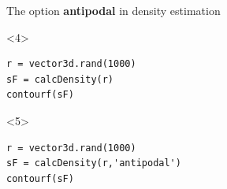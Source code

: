 \documentclass[compress]{beamer}
\begin{document}
\begin{frame}[fragile]
\begin{columns}
\begin{column}{8.5cm}
\begin{overlayarea}{8.5cm}{8cm}
\medskip
\pause

The option \textbf{antipodal} in density estimation
\begin{onlyenv}<4>
\begin{lstlisting}[style=input]
r = vector3d.rand(1000)
sF = calcDensity(r)
contourf(sF)
\end{lstlisting}
\end{onlyenv}
\begin{onlyenv}<5>
  \begin{lstlisting}[style=input]
r = vector3d.rand(1000)
sF = calcDensity(r,'antipodal')
contourf(sF)
\end{lstlisting}
\end{onlyenv}
\end{overlayarea}
\end{column}
  \begin{column}{3.5cm}

\end{column}
\end{columns}
\end{frame}
\end{document}

